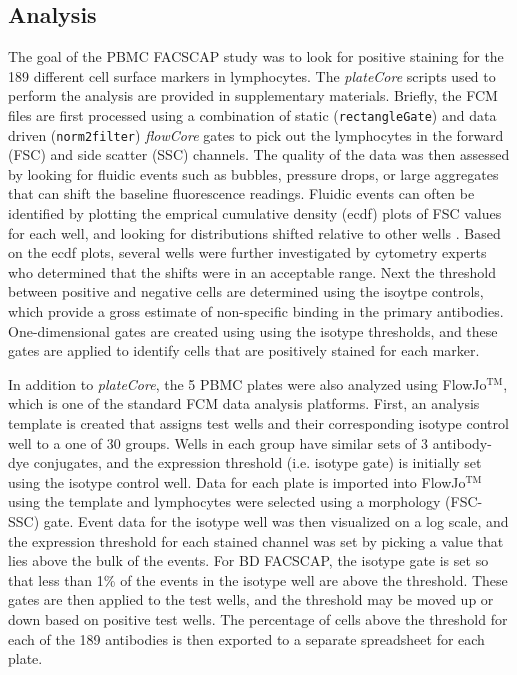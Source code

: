 \documentclass[12pt]{article}
\newcommand{\Robject}[1]{{\texttt{#1}}}
\newcommand{\Rpackage}[1]{{\textit{#1}}}
\begin{document}
\subsection*{Analysis}

The goal of the PBMC FACS\texttrademark CAP study was to look for positive staining for the 189 different cell
surface markers in lymphocytes. The \Rpackage{plateCore} scripts used to perform the analysis are provided 
in supplementary materials. Briefly, the FCM files are first processed using a combination of static (\Robject{rectangleGate})
and data driven (\Robject{norm2filter}) \Rpackage{flowCore} gates to pick out the lymphocytes in the forward (FSC) and side scatter (SSC)
channels.  The quality of the data was then assessed by looking for fluidic events such as bubbles,
pressure drops, or large aggregates that can shift the baseline fluorescence readings. 
Fluidic events can often be identified by plotting the emprical cumulative density (ecdf) plots of FSC
values for each well, and looking for distributions shifted relative to other wells \citep{lemeur2007}. Based on the ecdf
plots, several wells were further investigated by cytometry experts who determined that the shifts were in an acceptable range.
Next the threshold between positive and negative cells are determined using the isoytpe controls, which provide a gross estimate
of non-specific binding in the primary antibodies. One-dimensional gates are created using using the isotype thresholds, and these
gates are applied to identify cells that are positively stained for each marker. 

In addition to \Rpackage{plateCore}, the 5 PBMC plates were also analyzed using FlowJo$^{\text{TM}}$,
which is one of the standard FCM data analysis platforms. First, an analysis template is created that
assigns test wells and their corresponding isotype control well to a one of 30 groups. Wells in each
group have similar sets of 3 antibody-dye conjugates, and the expression threshold (i.e. isotype gate)
is initially set using the isotype control well. Data for each plate is imported into FlowJo$^{\text{TM}}$
using the template and
lymphocytes were selected using a morphology (FSC-SSC) gate. Event data for the isotype well was then
visualized on a log scale, and the expression threshold for each stained channel was set by picking a
value that lies above the bulk of the events. For BD FACS\texttrademark CAP, the isotype gate is set so that less than
1\% of the events in the isotype well are above the threshold. These gates are then applied to the test
wells, and the threshold may be moved up or down based on positive test wells. The percentage
of cells above the threshold for each of the 189 antibodies is then exported to a separate spreadsheet for 
each plate.
\end{document}
